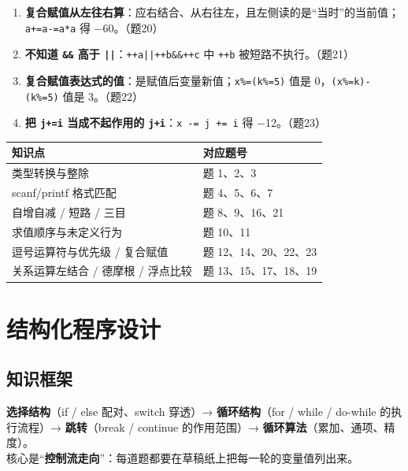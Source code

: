 \documentclass[UTF8,zihao=-4,a4paper]{ctexart}
\begin{document}
\begin{yicuodian}
\begin{enumerate}
  \item \textbf{复合赋值从左往右算}：应右结合、从右往左，且左侧读的是“当时”的当前值；\texttt{a+=a-=a*a} 得 −60。（题20）
  \item \textbf{不知道 \texttt{\&\&} 高于 \texttt{||}}：\texttt{++a||++b\&\&++c} 中 \texttt{++b} 被短路不执行。（题21）
  \item \textbf{复合赋值表达式的值}：是赋值后变量新值；\texttt{x\%=(k\%=5)} 值是 0，\texttt{(x\%=k)-(k\%=5)} 值是 3。（题22）
  \item \textbf{把 \texttt{j+=i} 当成不起作用的 \texttt{j+i}}：\texttt{x -= j += i} 得 −12。（题23）
\end{enumerate}
\end{yicuodian}

\begin{tipbox}[自测指路 · 第 2 章]
\begin{tabularx}{\linewidth}{p{5.2cm} X}
\toprule
知识点 & 对应题号\\
\midrule
类型转换与整除 & 题 1、2、3\\
scanf/printf 格式匹配 & 题 4、5、6、7\\
自增自减 / 短路 / 三目 & 题 8、9、16、21\\
求值顺序与未定义行为 & 题 10、11\\
逗号运算符与优先级 / 复合赋值 & 题 12、14、20、22、23\\
关系运算左结合 / 德摩根 / 浮点比较 & 题 13、15、17、18、19\\
\bottomrule
\end{tabularx}
\end{tipbox}


\section{结构化程序设计}

\subsection{知识框架}

\begin{keybox}[本章脉络]
\textbf{选择结构}（if / else 配对、switch 穿透）→ \textbf{循环结构}（for / while / do-while 的执行流程）→ \textbf{跳转}（break / continue 的作用范围）→ \textbf{循环算法}（累加、通项、精度）。\\
核心是“\textbf{控制流走向}”：每道题都要在草稿纸上把每一轮的变量值列出来。
\end{keybox}
\end{document}
